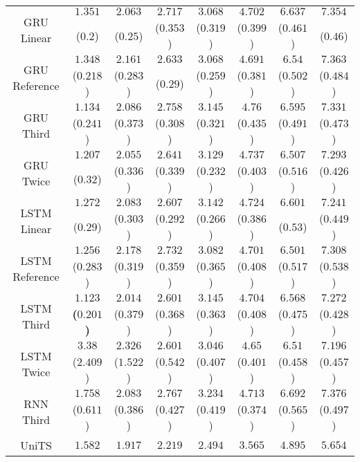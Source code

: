 \begin{table}[!ht]
{\begin{tabular}{|c|c|c|c|c|c|c|c|}
			\multirow{2}{*}{GRU Linear} & $1.351$ & $2.063$ & $2.717$ & $3.068$ & $4.702$ & $6.637$ & $7.354$ \\
			 & ($0.2$) & ($0.25$) & ($0.353$) & ($0.319$) & ($0.399$) & ($0.461$) & ($0.46$) \\ \hline
			\multirow{2}{*}{GRU Reference} & $1.348$ & $2.161$ & $2.633$ & $3.068$ & $4.691$ & $6.54$ & $7.363$ \\
			 & ($0.218$) & ($0.283$) & ($0.29$) & ($0.259$) & ($0.381$) & ($0.502$) & ($0.484$) \\ \hline
			\multirow{2}{*}{GRU Third} & $1.134$ & $2.086$ & $2.758$ & $3.145$ & $4.76$ & $6.595$ & $7.331$ \\
			 & ($0.241$) & ($0.373$) & ($0.308$) & ($0.321$) & ($0.435$) & ($0.491$) & ($0.473$) \\ \hline
			\multirow{2}{*}{GRU Twice} & $1.207$ & $2.055$ & $2.641$ & $3.129$ & $4.737$ & $6.507$ & $7.293$ \\
			 & ($0.32$) & ($0.336$) & ($0.339$) & ($0.232$) & ($0.403$) & ($0.516$) & ($0.426$) \\ \hline
			\multirow{2}{*}{LSTM Linear} & $1.272$ & $2.083$ & $2.607$ & $3.142$ & $4.724$ & $6.601$ & $7.241$ \\
			 & ($0.29$) & ($0.303$) & ($0.292$) & ($0.266$) & ($0.386$) & ($0.53$) & ($0.449$) \\ \hline
			\multirow{2}{*}{LSTM Reference} & $1.256$ & $2.178$ & $2.732$ & $3.082$ & $4.701$ & $6.501$ & $7.308$ \\
			 & ($0.283$) & ($0.319$) & ($0.359$) & ($0.365$) & ($0.408$) & ($0.517$) & ($0.538$) \\ \hline
			\multirow{2}{*}{LSTM Third} & $\mathbf{1.123}$ & $2.014$ & $2.601$ & $3.145$ & $4.704$ & $6.568$ & $7.272$ \\
			 & \textbf{(}$\mathbf{0.201}$\textbf{)} & ($0.379$) & ($0.368$) & ($0.363$) & ($0.408$) & ($0.475$) & ($0.428$) \\ \hline
			\multirow{2}{*}{LSTM Twice} & $3.38$ & $2.326$ & $2.601$ & $3.046$ & $4.65$ & $6.51$ & $7.196$ \\
			 & ($2.409$) & ($1.522$) & ($0.542$) & ($0.407$) & ($0.401$) & ($0.458$) & ($0.457$) \\ \hline
			\multirow{2}{*}{RNN Third} & $1.758$ & $2.083$ & $2.767$ & $3.234$ & $4.713$ & $6.692$ & $7.376$ \\
			 & ($0.611$) & ($0.386$) & ($0.427$) & ($0.419$) & ($0.374$) & ($0.565$) & ($0.497$) \\ \hline
			\multirow{2}{*}{UniTS} & $1.582$ & $1.917$ & $\mathbf{2.219}$ & $\mathbf{2.494}$ & $\mathbf{3.565}$ & $\mathbf{4.895}$ & $5.654$ \\

\end{tabular}}
\end{table}
